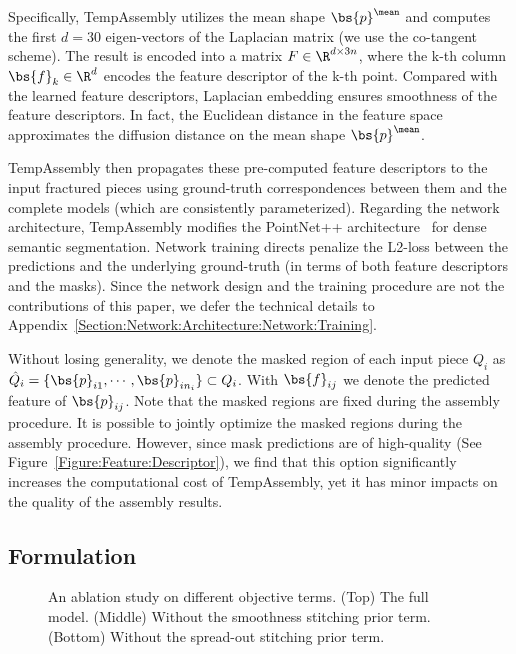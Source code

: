 Specifically, TempAssembly utilizes the mean shape $\bs{p}^{\mean}$ and computes the first $d=30$ eigen-vectors of the Laplacian matrix (we use the co-tangent scheme). The result is encoded into a matrix $F\in \R^{d\times 3n}$, where the k-th column $\bs{f}_k\in \R^d$ encodes the feature descriptor of the k-th point. Compared with the learned feature descriptors, Laplacian embedding ensures smoothness of the feature descriptors. In fact, the Euclidean distance in the feature space approximates the diffusion distance on the mean shape $\bs{p}^{\mean}$. 

TempAssembly then propagates these pre-computed feature descriptors to the input fractured pieces using ground-truth correspondences between them and the complete models (which are consistently parameterized). Regarding the network architecture, TempAssembly modifies the PointNet++ architecture~\cite{DBLP:conf/nips/QiYSG17} for dense semantic segmentation. Network training directs penalize the L2-loss between the predictions and the underlying ground-truth (in terms of both feature descriptors and the masks). Since the network design and the training procedure are not the contributions of this paper, we defer the technical details to Appendix~\ref{Section:Network:Architecture:Network:Training}.   

Without losing generality, we denote the masked region of each input piece $Q_i$ as $\hat{Q}_i = \{\bs{p}_{i1},\cdots, \bs{p}_{in_i}\}\subset Q_i$. With $\bs{f}_{ij}$ we denote the predicted feature of $\bs{p}_{ij}$. Note that the masked regions are fixed during the assembly procedure. It is possible to jointly optimize the masked regions during the assembly procedure. However, since mask predictions are of high-quality (See Figure~\ref{Figure:Feature:Descriptor}), we find that this option significantly increases the computational cost of TempAssembly,  yet it has minor impacts on the quality of the assembly results.

\subsection{Formulation}
\label{Subsection:Formulation}

\begin{figure*}
\vspace{3in}
\caption{An ablation study on different objective terms. (Top) The full model. (Middle) Without the smoothness stitching prior term. (Bottom) Without the spread-out stitching prior term.}
\label{Figure:Ablation:Study}
\end{figure*}

